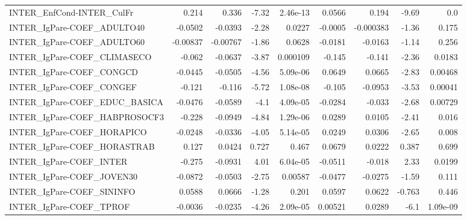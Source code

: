 \begin{tabular}{lrrrrrrrr}
INTER\_EnfCond-INTER\_CulFr             &       0.214 &        0.336 &   -7.32 & 2.46e-13 &     0.0566 &       0.194 &        -9.69 &           0.0 \\
INTER\_IgPare-COEF\_ADULTO40            &     -0.0502 &      -0.0393 &   -2.28 &   0.0227 &    -0.0005 &   -0.000383 &        -1.36 &         0.175 \\
INTER\_IgPare-COEF\_ADULTO60            &    -0.00837 &     -0.00767 &   -1.86 &   0.0628 &    -0.0181 &     -0.0163 &        -1.14 &         0.256 \\
INTER\_IgPare-COEF\_CLIMASECO           &      -0.062 &      -0.0637 &   -3.87 & 0.000109 &     -0.145 &      -0.141 &        -2.36 &        0.0183 \\
INTER\_IgPare-COEF\_CONGCD              &     -0.0445 &      -0.0505 &   -4.56 & 5.09e-06 &     0.0649 &      0.0665 &        -2.83 &       0.00468 \\
INTER\_IgPare-COEF\_CONGEF              &      -0.121 &       -0.116 &   -5.72 & 1.08e-08 &     -0.105 &     -0.0953 &        -3.53 &       0.00041 \\
INTER\_IgPare-COEF\_EDUC\_BASICA         &     -0.0476 &      -0.0589 &    -4.1 & 4.09e-05 &    -0.0284 &      -0.033 &        -2.68 &       0.00729 \\
INTER\_IgPare-COEF\_HABPROSOCF3         &      -0.228 &      -0.0949 &   -4.84 & 1.29e-06 &     0.0289 &      0.0105 &        -2.41 &         0.016 \\
INTER\_IgPare-COEF\_HORAPICO            &     -0.0248 &      -0.0336 &   -4.05 & 5.14e-05 &     0.0249 &      0.0306 &        -2.65 &         0.008 \\
INTER\_IgPare-COEF\_HORASTRAB           &       0.127 &       0.0424 &   0.727 &    0.467 &     0.0679 &      0.0222 &        0.387 &         0.699 \\
INTER\_IgPare-COEF\_INTER               &      -0.275 &      -0.0931 &    4.01 & 6.04e-05 &    -0.0511 &      -0.018 &         2.33 &        0.0199 \\
INTER\_IgPare-COEF\_JOVEN30             &     -0.0872 &      -0.0503 &   -2.75 &  0.00587 &    -0.0477 &     -0.0275 &        -1.59 &         0.111 \\
INTER\_IgPare-COEF\_SININFO             &      0.0588 &       0.0666 &   -1.28 &    0.201 &     0.0597 &      0.0622 &       -0.763 &         0.446 \\
INTER\_IgPare-COEF\_TPROF               &     -0.0036 &      -0.0235 &   -4.26 & 2.09e-05 &    0.00521 &      0.0289 &         -6.1 &      1.09e-09 \\

\end{tabular}
